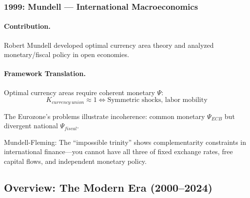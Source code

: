 \subsubsection{1999: Mundell --- International Macroeconomics}

\paragraph{Contribution.}
Robert Mundell developed optimal currency area theory and
analyzed monetary/fiscal policy in open economies.

\paragraph{Framework Translation.}
Optimal currency areas require coherent monetary $\Psi$:
\begin{equation}
  K_{currency\ union} \approx 1 \Leftrightarrow \text{Symmetric shocks, labor mobility}
\end{equation}

The Eurozone's problems illustrate incoherence:
common monetary $\Psi_{ECB}$ but divergent national $\Psi_{fiscal}$.

Mundell-Fleming: The ``impossible trinity'' shows complementarity constraints
in international finance---you cannot have all three of fixed exchange rates,
free capital flows, and independent monetary policy.

\subsection{Overview: The Modern Era (2000--2024)}

